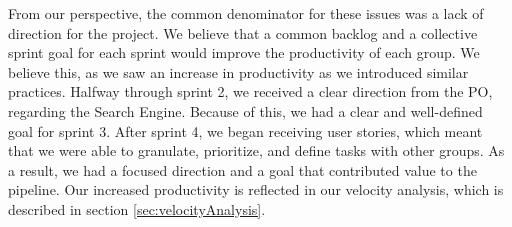 From our perspective, the common denominator for these issues was a lack of direction for the \knox{} project. We believe that a common backlog and a collective sprint goal for each \knox{} sprint would improve the productivity of each \knox{} group. We believe this, as we saw an increase in productivity as we introduced similar practices.
Halfway through sprint 2, we received a clear direction from the \knox{} PO, regarding the Search Engine. Because of this, we had a clear and well-defined goal for sprint 3.
After sprint 4, we began receiving user stories, which meant that we were able to granulate, prioritize, and define tasks with other groups. As a result, we had a focused direction and a goal that contributed value to the \knox{} pipeline.
Our increased productivity is reflected in our velocity analysis, which is described in section \ref{sec:velocityAnalysis}.




